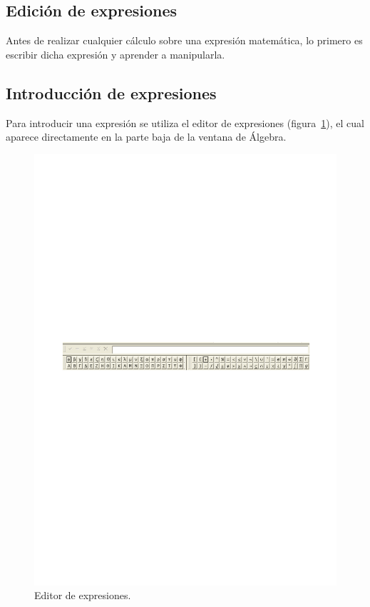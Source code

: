 \subsection*{Edición de expresiones}
Antes de realizar cualquier cálculo sobre una expresión matemática,
lo primero es escribir dicha expresión y aprender a manipularla.
\subsection*{Introducción de expresiones}
Para introducir una expresión se utiliza el editor de expresiones
(figura~\ref{g:editor}), el cual aparece directamente en la parte
baja de la ventana de Álgebra.
\begin{figure}[h!]
\begin{center}
\includegraphics[scale=0.6]{img/introduccion_derive/authorexpression}
\caption{Editor de expresiones.} \label{g:editor} 
\end{center} 
\end{figure}

